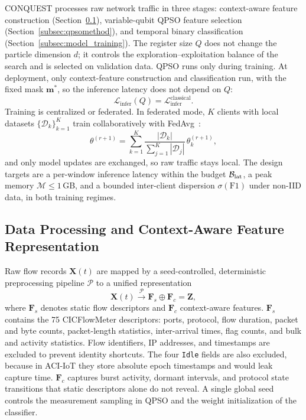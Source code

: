 \documentclass[conference]{IEEEtran}
\begin{document}
CONQUEST processes raw network traffic in three stages:
context-aware feature construction
(Section~\ref{subsec:feature_pipeline}), variable-qubit QPSO feature
selection (Section~\ref{subsec:qpsomethod}), and temporal binary
classification (Section~\ref{subsec:model_training}).
The register size $Q$ does not change the
particle dimension $d$; it controls the exploration--exploitation
balance of the search and is selected on validation data. QPSO runs
only during training. At deployment, only context-feature construction and
classification run, with the fixed mask $\mathbf{m}^{*}$, so the
inference latency does not depend on $Q$:
\begin{equation}
\mathcal{L}_{\text{infer}}(Q) =
\mathcal{L}_{\text{infer}}^{\text{classical}}.
\label{eq:infer_invariance}
\end{equation}
Training is centralized or federated. In federated mode, $K$ clients
with local datasets $\{\mathcal{D}_k\}_{k=1}^{K}$ train
collaboratively with FedAvg~\cite{mcmahan2017fedavg}:
\begin{equation}
\theta^{(r+1)} = \sum_{k=1}^{K}
\frac{|\mathcal{D}_k|}{\sum_{j=1}^{K}|\mathcal{D}_j|}
\,\theta_k^{(r+1)},
\label{eq:fedavg_overview}
\end{equation}
and only model updates are exchanged, so raw
traffic stays local. The design targets are
a per-window inference latency within the budget
$\mathcal{B}_{\rm lat}$, a peak memory $\mathcal{M}\le1$\,GB, and a
bounded inter-client dispersion $\sigma(\mathrm{F1})$ under non-IID
data, in both training regimes.


\subsection{Data Processing and Context-Aware Feature
            Representation}
\label{subsec:feature_pipeline}

Raw flow records $\mathbf{X}(t)$ are mapped by a seed-controlled,
deterministic preprocessing pipeline $\mathcal{P}$ to a unified
representation
\begin{equation}
\mathbf{X}(t) \xrightarrow{\mathcal{P}}
\mathbf{F}_s \oplus \mathbf{F}_c = \mathbf{Z},
\label{eq:feature_fusion}
\end{equation}
where $\mathbf{F}_s$ denotes static flow descriptors and
$\mathbf{F}_c$ context-aware features.
$\mathbf{F}_s$ contains the 75 CICFlowMeter
descriptors: ports, protocol, flow duration, packet and byte counts,
packet-length statistics, inter-arrival times, flag counts, and bulk
and activity statistics. Flow identifiers, IP addresses, and
timestamps are excluded to prevent identity shortcuts. The four
\texttt{Idle} fields are also excluded, because in ACI-IoT they store
absolute epoch timestamps and would leak capture time.
$\mathbf{F}_c$ captures burst activity, dormant intervals, and
protocol state transitions that static descriptors alone do not
reveal. A single global seed controls the
measurement sampling in QPSO and the
weight initialization of the classifier.
\end{document}
